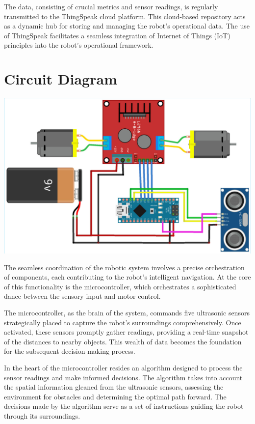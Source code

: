 \documentclass{article}
\begin{document}
    The data, consisting of crucial metrics and sensor readings, is regularly transmitted to the ThingSpeak cloud platform. This cloud-based repository acts as a dynamic hub for storing and managing the robot's operational data. The use of ThingSpeak facilitates a seamless integration of Internet of Things (IoT) principles into the robot's operational framework.

\section{Circuit Diagram}
    \begin{center}
    \includegraphics[width=15cm]{circuit-diagram.jpeg}
    \end{center}
    The seamless coordination of the robotic system involves a precise orchestration of components, each contributing to the robot's intelligent navigation. At the core of this functionality is the microcontroller, which orchestrates a sophisticated dance between the sensory input and motor control.

    The microcontroller, as the brain of the system, commands five ultrasonic sensors strategically placed to capture the robot's surroundings comprehensively. Once activated, these sensors promptly gather readings, providing a real-time snapshot of the distances to nearby objects. This wealth of data becomes the foundation for the subsequent decision-making process.

    In the heart of the microcontroller resides an algorithm designed to process the sensor readings and make informed decisions. The algorithm takes into account the spatial information gleaned from the ultrasonic sensors, assessing the environment for obstacles and determining the optimal path forward. The decisions made by the algorithm serve as a set of instructions guiding the robot through its surroundings.
\end{document}
